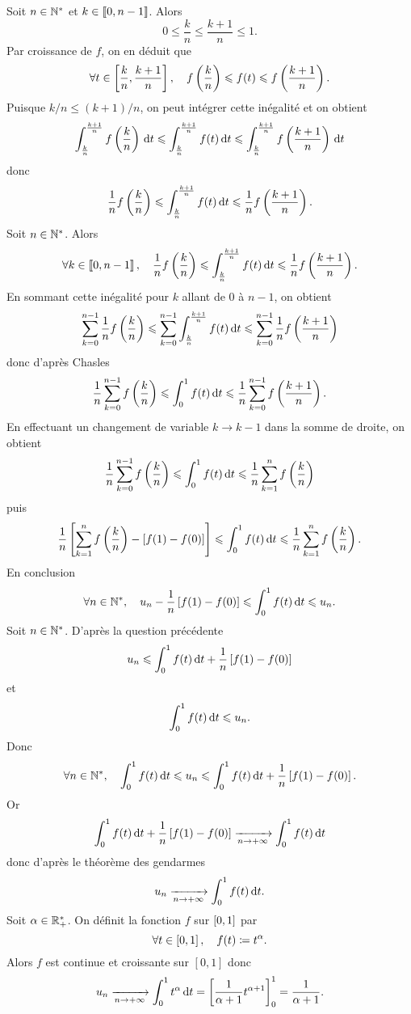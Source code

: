 \documentclass{magnolia}
\begin{document}
\begin{sol}
\begin{questions}
\question Soit $n\in{\mathbb{N}^*}$ et $k\in\left\llbracket 0,n-1\right\rrbracket$. Alors
  \[0\leq\frac{k}{n}\leq\frac{k+1}{n}\leq 1.\]
  Par croissance de $f$, on en déduit que
  \[\forall t\in\left[\frac{k}{n},\frac{k+1}{n}\right],\quad f\left(\frac{k}{n}\right)\leqslant f(t)\leqslant f\left(\frac{k+1}{n}\right).\]
  Puisque $k/n\leq (k+1)/n$, on peut intégrer cette inégalité et on obtient
  \[\int_{\frac{k}{n}}^{\frac{k+1}{n}} f\left(\frac{k}{n}\right)\,\text{d}t\leqslant
    \int_{\frac{k}{n}}^{\frac{k+1}{n}} f(t)\,\text{d}t\leqslant
    \int_{\frac{k}{n}}^{\frac{k+1}{n}} f\left(\frac{k+1}{n}\right)\,\text{d}t\]
  donc
  \[\frac{1}{n}f\left(\frac{k}{n}\right)\leqslant\int_{\frac{k}{n}}^{\frac{k+1}{n}} f(t)\,\text{d}t
    \leqslant \frac{1}{n}f\left(\frac{k+1}{n}\right).\]
\question Soit $n\in{\mathbb{N}^*}$. Alors
  \[\forall k\in\left\llbracket 0,n-1\right\rrbracket,\quad \frac{1}{n}f\left(\frac{k}{n}\right)\leqslant
    \int_{\frac{k}{n}}^{\frac{k+1}{n}} f(t)\,\text{d}t
    \leqslant \frac{1}{n}f\left(\frac{k+1}{n}\right).\]
  En sommant cette inégalité pour $k$ allant de 0 à $n-1$, on obtient
  \[\sum_{k=0}^{n-1} \frac{1}{n}f\left(\frac{k}{n}\right)\leqslant
    \sum_{k=0}^{n-1} \int_{\frac{k}{n}}^{\frac{k+1}{n}} f(t)\,\text{d}t
    \leqslant \sum_{k=0}^{n-1} \frac{1}{n}f\left(\frac{k+1}{n}\right)\]
  donc d'après Chasles
  \[\frac{1}{n}\sum_{k=0}^{n-1} f\left(\frac{k}{n}\right)\leqslant
    \int_{0}^{1} f(t)\,\text{d}t
    \leqslant \frac{1}{n} \sum_{k=0}^{n-1} f\left(\frac{k+1}{n}\right).\]
  En effectuant un changement de variable $k\to k-1$ dans la somme de droite, on obtient
    \[\frac{1}{n}\sum_{k=0}^{n-1} f\left(\frac{k}{n}\right)\leqslant
    \int_{0}^{1} f(t)\,\text{d}t
    \leqslant \frac{1}{n}\sum_{k=1}^{n} f\left(\frac{k}{n}\right)\]
  puis
    \[\frac{1}{n}\left[\sum_{k=1}^{n} f\left(\frac{k}{n}\right)-\left[f(1)-f(0)\right]\right]\leqslant
    \int_{0}^{1} f(t)\,\text{d}t
    \leqslant \frac{1}{n}\sum_{k=1}^{n} f\left(\frac{k}{n}\right).\]
  En conclusion
  \[\forall n\in{\mathbb{N}^*},\quad u_n-\frac{1}{n}\left[f(1)-f(0)\right] \leqslant \int_{0}^{1} f(t)\,\text{d}t\leqslant u_n.\]
\question Soit $n\in{\mathbb{N}^*}$. D'après la question précédente
  \[u_n\leqslant \int_{0}^{1} f(t)\,\text{d}t+\frac{1}{n}\left[f(1)-f(0)\right]\]
  et
  \[\int_{0}^{1} f(t)\,\text{d}t\leqslant u_n.\]
  Donc
  \[\forall n\in{\mathbb{N}^*},\quad \int_{0}^{1} f(t)\,\text{d}t\leqslant u_n \leqslant\int_{0}^{1} f(t)\,\text{d}t+\frac{1}{n}\left[f(1)-f(0)\right].\]
  Or
  \[\int_{0}^{1} f(t)\,\text{d}t+\frac{1}{n}\left[f(1)-f(0)\right]\xrightarrow[n\rightarrow +\infty]{}\int_{0}^{1} f(t)\,\text{d}t\]
  donc d'après le théorème des gendarmes
  \[u_n\xrightarrow[n\rightarrow +\infty]{}\int_{0}^{1} f(t)\,\text{d}t.\]
\question Soit $\alpha\in\mathbb{R}_+^*$. On définit la fonction $f$ sur $\left[0,1\right]$ par
  \[\forall t\in\left[0,1\right],\quad f(t)\coloneqq t^\alpha.\]
  Alors $f$ est continue et croissante sur $[0,1]$ donc
  \[u_n \xrightarrow[n\rightarrow +\infty]{} \int_{0}^{1} t^\alpha\,\text{d}t=\left[ \frac{1}{\alpha+1}t^{\alpha+1} \right]_{0}^{1}=\frac{1}{\alpha+1}.\]

\end{questions}
\end{sol}
\end{document}
